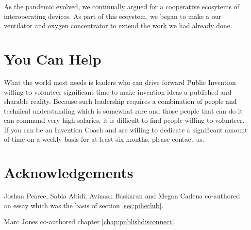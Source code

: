 \documentclass[
	fontsize=10pt, %
	twoside=false, %
	secnumdepth=1, %
]{kaobook}
\begin{document}
As the pandemic evolved, we continually argued for a cooperative
ecosytems of interoperating devices.
As part of this ecoystem, we began to make a our ventilator
and oxygen concentrator to extend the work we had already done.

\chapter{You Can Help}

What the world most needs is leaders who can drive forward
Public Invention willing to volunteer significant time
to make invention ideas a published and sharable reality.
Because such leadership requires a combination of people and
technical understanding which is somewhat rare and those
people that can do it can command very high salaries,
it is difficult to find people willing to volunteer.
If you can be an Invention Coach and are willing to
dedicate a significant amount of time on a weekly basis
for at least six months, please contact us.




\appendix %



\chapter*{Acknowledgements}

Joshua Pearce, Sabia Abidi, Avinash Baskaran and Megan Cadena co-authored an essay which was the basis of section \ref{sec:piheclub}.

Marc Jones co-authored chapter \ref{chap:publishdisconnect}.


\backmatter %



\printbibliography[heading=bibintoc, title=Bibliography, prenote=bibnote] %



\printindex %
\end{document}

